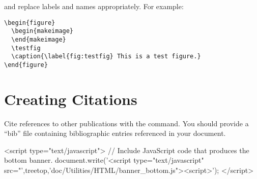 \documentclass[11pt]{article}
\begin{document}


and replace labels and names appropriately.  For example:

\begin{verbatim}
\begin{figure}
  \begin{makeimage}
  \end{makeimage}
  \testfig
  \caption{\label{fig:testfig} This is a test figure.}
\end{figure}
\end{verbatim}


\section{Creating Citations}

Cite references to other publications with the  command.
You should provide a ``bib'' file containing bibliographic entries
referenced in your document.



\begin{rawhtml}
  <script type="text/javascript">
  // Include JavaScript code that produces the bottom banner.
  document.write('<script type="text/javascript" src="',treetop,'doc/Utilities/HTML/banner_bottom.js"><\/script>');
  </script>
\end{rawhtml}
\end{document}
